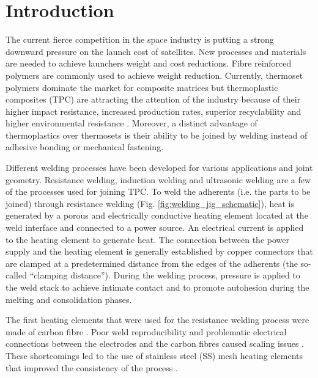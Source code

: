 \documentclass[11pt,review,times]{elsarticle}
\begin{document}
							\section{Introduction}

The current fierce competition in the space industry is putting a strong downward pressure on the launch cost of satellites. 
New processes and materials are needed to achieve launchers weight and cost reductions. 
Fibre reinforced polymers are commonly used to achieve weight reduction. 
Currently, thermoset polymers dominate the market for composite matrices but thermoplastic composites (TPC) are attracting the attention of the industry \cite{CompositeWorldSloan2018} because of their higher impact resistance, increased production rates, superior recyclability and higher environmental resistance \cite{cogswell1992}. 
Moreover, a distinct advantage of thermoplastics over thermosets is their ability to be joined by welding instead of adhesive bonding or mechanical fastening. 

Different welding processes have been developed for various applications and joint geometry. 
Resistance welding, induction welding and ultrasonic welding are a few of the processes used for joining TPC. 
To weld the adherents (i.e. the parts to be joined) through resistance welding (Fig. \ref{fig:welding_jig_schematic}), heat is generated by a porous and electrically conductive heating element located at the weld interface and connected to a power source. 
An electrical current is applied to the heating element to generate heat. 
The connection between the power supply and the heating element is generally established by copper connectors that are clamped at a predetermined distance from the edges of the adherents (the so-called “clamping distance”). 
During the welding process, pressure is applied to the weld stack to achieve intimate contact and to promote autohesion during the melting and consolidation phases. 

The first heating elements that were used for the resistance welding process were made of carbon fibre  \cite{Ageorges2000a,houghton1984bonding,Eveno1988}.
Poor weld reproducibility and problematic electrical connections between the electrodes and the carbon fibres caused scaling issues \cite{McKnight1997}. 
These shortcomings led to the use of stainless steel (SS) mesh heating elements that improved the consistency of the process \cite{Hou1999a}.
\end{document}

